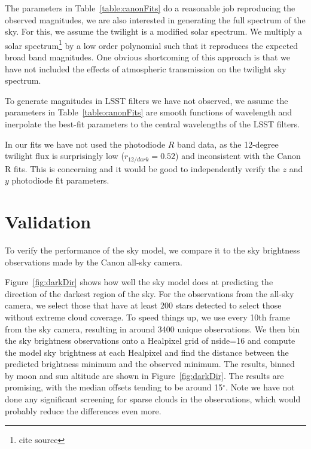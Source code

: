 \documentclass{emulateapj}  %
\newcommand\degree{{^\circ}}
\begin{document}
The parameters in Table~\ref{table:canonFits} do a reasonable job reproducing the observed magnitudes, we are also interested in generating the full spectrum of the sky.  For this, we assume the twilight is a modified solar spectrum.  We multiply a solar spectrum\footnote{cite source} by a low order polynomial such that it reproduces the expected broad band magnitudes.  One obvious shortcoming of this approach is that we have not included the effects of atmospheric transmission on the twilight sky spectrum.

To generate magnitudes in LSST filters we have not observed, we assume the parameters in Table~\ref{table:canonFits} are smooth functions of wavelength and inerpolate the best-fit parameters to the central wavelengths of the LSST filters.

In our fits we have not used the photodiode $R$ band data, as the 12-degree twilight flux is surprisingly low ($r_{12/dark}=0.52$) and inconsistent with the Canon R fits.  This is concerning and it would be good to independently verify the $z$ and $y$ photodiode fit parameters.


\section{Validation}

To verify the performance of the sky model, we compare it to the sky brightness observations made by the Canon all-sky camera.

\begin{figure*}
  \caption{Some examples of Canon all-sky observations and model values for airmasses less than 2.1. The sky observations have been binned into alt-az Healpixels (zenith at the center of the projections). These are all for the Canon R-filter. The top row shows a clear dark-time frame, the second row is a dark time frame where there were clouds. The third row shows a high moon, and the final row is during twilight with some light clouds. \label{fig:skyExamples}}
\end{figure*}



Figure~\ref{fig:darkDir} shows how well the sky model does at predicting the direction of the darkest region of the sky.  For the observations from the all-sky camera, we select those that have at least 200 stars detected to select those without extreme cloud coverage. To speed things up, we use every 10th frame from the sky camera, resulting in around 3400 unique observations.  We then bin the sky brightness observations onto a Healpixel grid of nside=16 and compute the model sky brightness at each Healpixel and find the distance between the predicted brightness minimum and the observed minimum.  The results, binned by moon and sun altitude are shown in Figure~\ref{fig:darkDir}.  The results are promising, with the median offsets tending to be around 15$\degree$.  Note we have not done any significant screening for sparse clouds in the observations, which would probably reduce the differences even more. 
\end{document}
